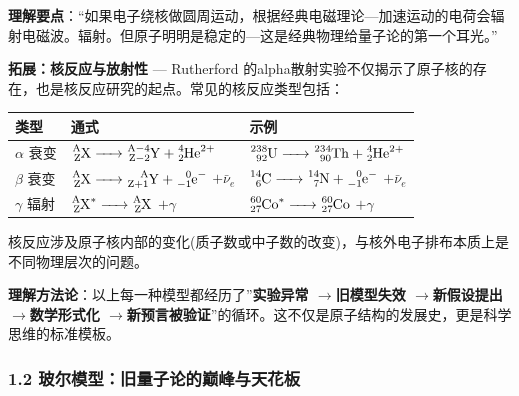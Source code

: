 \documentclass[a4paper,11pt]{ctexart}
\newcounter{none}
\newcommand{\箭}{\ensuremath{\rightarrow}}
\newcommand{\左箭}{\ensuremath{\leftarrow}}
\newcommand{\上箭}{\ensuremath{\uparrow}}
\newcommand{\下箭}{\ensuremath{\downarrow}}
\newcommand{\衡}{\ensuremath{\rightleftharpoons}}
\newcommand{\双箭}{\ensuremath{\leftrightarrow}}
\newcommand{\约等于}{\ensuremath{\approx}}
\newcommand{\小于等于}{\ensuremath{\leq}}
\newcommand{\大于等于}{\ensuremath{\geq}}
\newcommand{\不等于}{\ensuremath{\neq}}
\newcommand{\西格马}{\ensuremath{\sigma}}
\newcommand{\派}{\ensuremath{\pi}}
\begin{document}
\textbf{理解要点}：``如果电子绕核做圆周运动，根据经典电磁理论---加速运动的电荷会辐射电磁波。辐射。但原子明明是稳定的---这是经典物理给量子论的第一个耳光。''

\textbf{拓展：核反应与放射性} --- Rutherford 的alpha散射实验不仅揭示了原子核的存在，也是核反应研究的起点。常见的核反应类型包括：

{\def\LTcaptype{none} %
\begin{longtable}[]{@{}
  >{\raggedright\arraybackslash}p{}
  >{\raggedright\arraybackslash}p{}
  >{\raggedright\arraybackslash}p{}@{}}
\toprule\noalign{}
\begin{minipage}[b]{\linewidth}\raggedright
类型
\end{minipage} & \begin{minipage}[b]{\linewidth}\raggedright
通式
\end{minipage} & \begin{minipage}[b]{\linewidth}\raggedright
示例
\end{minipage} \\
\midrule\noalign{}
\endhead
\bottomrule\noalign{}
\endlastfoot
\(\alpha\) 衰变 & \(\ce{^{A}_{Z}X -> ^{A-4}_{Z-2}Y + ^{4}_{2}He^{2+}}\) & \(\ce{^{238}_{92}U -> ^{234}_{90}Th + ^{4}_{2}He^{2+}}\) \\
\(\beta\) 衰变 & \(\ce{^{A}_{Z}X -> ^{A}_{Z+1}Y + ^{0}_{-1}e^{-}}\) \(+ \bar{\nu}_e\) & \(\ce{^{14}_{6}C -> ^{14}_{7}N + ^{0}_{-1}e^{-}}\) \(+ \bar{\nu}_e\) \\
\(\gamma\) 辐射 & \(\ce{^{A}_{Z}X^{*} -> ^{A}_{Z}X}\) \(+ \gamma\) & \(\ce{^{60}_{27}Co^{*} -> ^{60}_{27}Co}\) \(+ \gamma\) \\
\end{longtable}
}

核反应涉及原子核内部的变化(质子数或中子数的改变)，与核外电子排布本质上是不同物理层次的问题。

\textbf{理解方法论}：以上每一种模型都经历了''\textbf{实验异常 \箭 旧模型失效 \箭 新假设提出 \箭 数学形式化 \箭 新预言被验证}''的循环。这不仅是原子结构的发展史，更是科学思维的标准模板。

\subsubsection{1.2 玻尔模型：旧量子论的巅峰与天花板}\label{ux73bbux5c14ux6a21ux578bux65e7ux91cfux5b50ux8bbaux7684ux5dc5ux5cf0ux4e0eux5929ux82b1ux677f}
\end{document}
